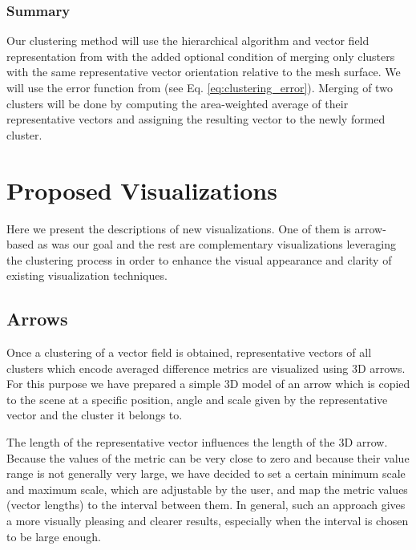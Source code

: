 \subsubsection{Summary}

Our clustering method will use the hierarchical algorithm and vector field representation from \citet{Telea99} with the added optional condition of merging only clusters with the same representative vector orientation relative to the mesh surface. We will use the error function from \citet{Peng12} (see Eq. \ref{eq:clustering_error}). Merging of two clusters will be done by computing the area-weighted average of their representative vectors and assigning the resulting vector to the newly formed cluster.
\section{Proposed Visualizations}
\label{sec:analysis_visualizations}

Here we present the descriptions of new visualizations. One of them is arrow-based as was our goal and the rest are complementary visualizations leveraging the clustering process in order to enhance the visual appearance and clarity of existing visualization techniques.

\subsection{Arrows}
\label{sec:arrow_vis}

Once a clustering of a vector field is obtained, representative vectors of all clusters which encode averaged difference metrics are visualized using 3D arrows. For this purpose we have prepared a simple 3D model of an arrow which is copied to the scene at a specific position, angle and scale given by the representative vector and the cluster it belongs to.

The length of the representative vector influences the length of the 3D arrow. Because the values of the metric can be very close to zero and because their value range is not generally very large, we have decided to set a certain minimum scale and maximum scale, which are adjustable by the user, and map the metric values (vector lengths) to the interval between them. In general, such an approach gives a more visually pleasing and clearer results, especially when the interval is chosen to be large enough.

